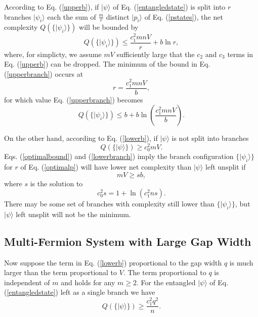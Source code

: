 \documentclass[12pt,amsmath,amssymb,onecolumn]{revtex4-2}
\begin{document}
According to Eq. (\ref{upperb}), if $|\psi \rangle $ of Eq. (\ref{entangledstate}) is split
into $r$ branches $|\psi_i \rangle $ each the sum of $\frac{m}{r}$ distinct
$|p_i \rangle $ of Eq. (\ref{pstates}),  the net complexity $Q( \{|\psi_i \rangle \})$ will be
bounded by
\begin{equation}
  \label{upperbranch}
  Q( \{|\psi_i \rangle \}) \le \frac{ c_1^2 mnV}{r} + b \ln r,
\end{equation}
where, for simplicty, we assume $mV$ sufficiently large that the $c_2$ and $c_3$
terms in Eq. (\ref{upperb}) can be dropped. The minimum of the bound in
Eq. (\ref{upperbranch}) occurs at
\begin{equation}
  \label{optimalp}
  r = \frac{c_1^2 m nV}{b},
\end{equation}
for which value Eq. (\ref{upperbranch}) becomes
\begin{equation}
  \label{optimalbound}
  Q( \{|\psi_i \rangle \}) \le b + b \ln(\frac{c_1^2 m n V}{b}).
\end{equation}

On the other hand, according to Eq. (\ref{lowerb}), if $|\psi \rangle $ is not 
split into branches
\begin{equation}
  \label{lowerbranch}
  Q( \{ |\psi \rangle  \}) \ge c_0^2 m V.
\end{equation}
Eqs. (\ref{optimalbound}) and (\ref{lowerbranch}) imply
the branch configuration $\{ |\psi_i \rangle  \}$ for
$r$ of Eq. (\ref{optimalp}) will have lower
net complexity than $|\psi \rangle $ left unsplit if
\begin{equation}
  \label{splitcondition8}
  m V  \ge s b,
\end{equation}
where $s$ is the solution to
\begin{equation}
  \label{eqfork}
  c_0^2 s = 1 + \ln ( c_1^2 n s).
\end{equation}
There may be some set of branches with
complexity still lower than $\{ |\psi_i \rangle \}$, 
but $|\psi \rangle $ left unsplit will not be the minimum.

\subsection{\label{subsec:nfermionsq} Multi-Fermion System with Large Gap Width}

Now suppose the term in Eq. (\ref{lowerb}) proportional to the gap width $q$ is
much larger than the term proportional to $V$. The term proportional to $q$ is
independent of $m$ and holds for any $m \ge 2$.
For the entangled $|\psi \rangle $ of Eq. (\ref{entangledstate}) left as a single branch
we have
\begin{equation}
  \label{unsplitlargegap}
  Q( \{ |\psi \rangle  \}) \ge \frac{ c_1^2 q^2}{n}.
\end{equation}
\end{document}

